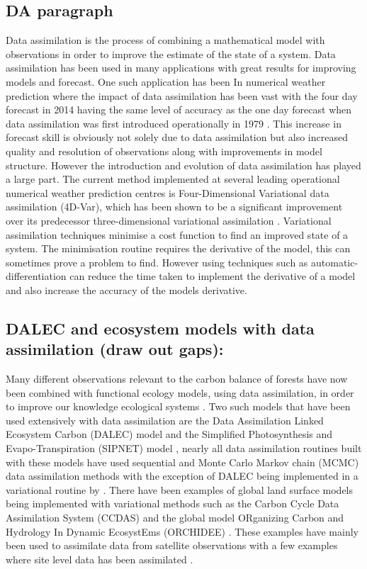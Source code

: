 \documentclass[11pt]{article}
\begin{document}
\subsection{DA paragraph}
Data assimilation is the process of combining a mathematical model with observations in order to improve the estimate of the state of a system. Data assimilation has been used in many applications with great results for improving models and forecast. One such application has been In numerical weather prediction where the impact of data assimilation has been vast with the four day forecast in 2014 having the same level of accuracy as the one day forecast when data assimilation was first introduced operationally in 1979 \citep{rabier2005overview, kalnay2003atmospheric}. This increase in forecast skill is obviously not solely due to data assimilation but also increased quality and resolution of observations along with improvements in model structure. However the introduction and evolution of data assimilation has played a large part. The current method implemented at several leading operational numerical weather prediction centres is Four-Dimensional Variational data assimilation (4D-Var), which has been shown to be a significant improvement over its predecessor three-dimensional variational assimilation \citep{lorenc2005does}. Variational assimilation techniques minimise a cost function to find an improved state of a system. The minimisation routine requires the derivative of the model, this can sometimes prove a problem to find. However using techniques such as automatic-differentiation can reduce the time taken to implement the derivative of a model and also increase the accuracy of the models derivative.

\subsection{DALEC and ecosystem models with data assimilation (draw out gaps):}
Many different observations relevant to the carbon balance of forests have now been combined with functional ecology models, using data assimilation, in order to improve our knowledge ecological systems \citep{zobitz2011primer, fox2009reflex}. Two such models that have been used extensively with data assimilation are the Data Assimilation Linked Ecosystem Carbon (DALEC) model \citep{williams2005improved} and the Simplified Photosynthesis and Evapo-Transpiration (SIPNET) model \citep{braswell2005estimating}, nearly all data assimilation routines built with these models have used sequential and Monte Carlo Markov chain (MCMC) data assimilation methods with the exception of DALEC being implemented in a variational routine by \citet{delahaies2013regularization}. There have been examples of global land surface models being implemented with variational methods such as the Carbon Cycle Data Assimilation System (CCDAS) \citep{Kaminski2013} and the global model ORganizing Carbon and Hydrology In Dynamic EcosystEms (ORCHIDEE) \citep{Krinner2005}. These examples have mainly been used to assimilate data from satellite observations with a few examples where site level data has been assimilated \citep{Verbeeck2011, Bacour2015}.
\end{document}
